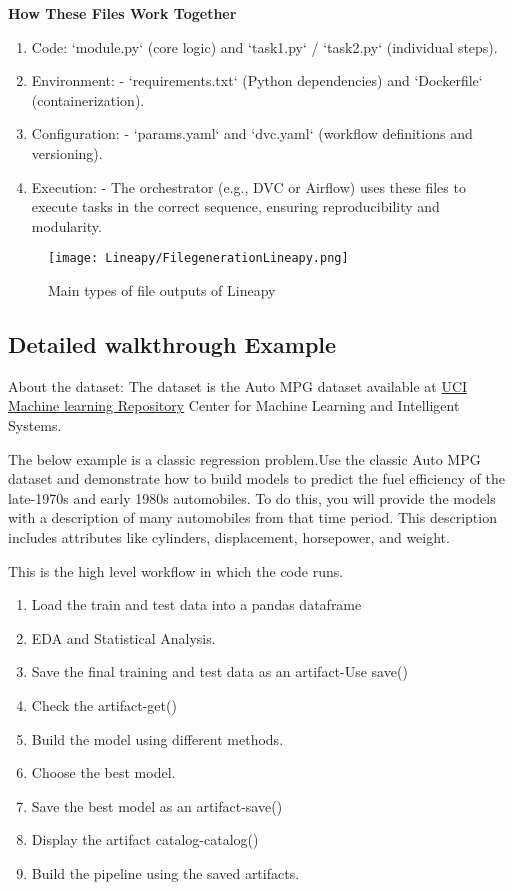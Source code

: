 \textbf{ How These Files Work Together}
\begin{enumerate}
	\item Code: 
	`module.py` (core logic) and `task1.py` / `task2.py` (individual steps).
	\item Environment: 
	- `requirements.txt` (Python dependencies) and `Dockerfile` (containerization).
	\item Configuration: 
	- `params.yaml` and `dvc.yaml` (workflow definitions and versioning).
	\item Execution: 
	- The orchestrator (e.g., DVC or Airflow) uses these files to execute tasks in the correct sequence, ensuring reproducibility and modularity.
\end{enumerate}

\begin{figure}[h!]
	\centering
	\texttt{[image: Lineapy/FilegenerationLineapy.png]}
	\caption{Main types of file outputs of Lineapy}
	\label{fig:Main types of file outputs of Lineapy}
\end{figure}

\pagebreak
	
		\subsection{Detailed walkthrough Example}

About the dataset: The dataset is the Auto MPG dataset available at
\href{https://archive.ics.uci.edu/ml/datasets/auto+mpg}{UCI Machine learning Repository} Center for Machine Learning and Intelligent Systems.

The below example is a classic regression problem.Use the classic Auto MPG dataset and demonstrate how to build models to predict the fuel efficiency of the late-1970s and early 1980s automobiles. To do this, you will provide the models with a description of many automobiles from that time period. This description includes attributes like cylinders, displacement, horsepower, and weight.

This is the high level workflow in which the code runs.
\begin{enumerate}
	\item Load the train and test data into a pandas dataframe
	\item EDA and Statistical Analysis.
	\item Save the final training and test data as an artifact-Use save()
	\item Check the artifact-get()
	\item Build the model using different methods.
	\item Choose the best model.
	\item Save the best model as an artifact-save()
	\item Display the artifact catalog-catalog()
	\item Build the pipeline using the saved artifacts.
\end{enumerate}
	
